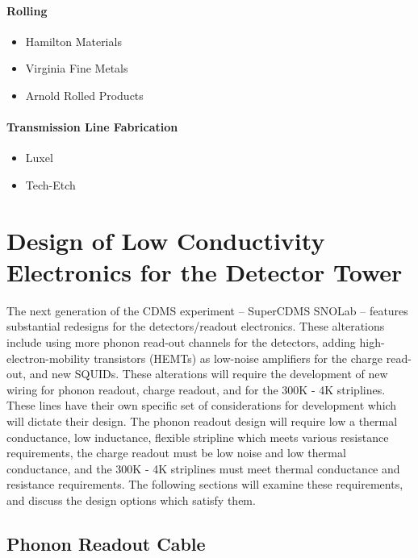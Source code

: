 \documentclass{report}
\begin{document}
\subsubsection{Rolling}
\begin{itemize}
\item Hamilton Materials
\item Virginia Fine Metals
\item Arnold Rolled Products
\end{itemize}

\subsubsection{Transmission Line Fabrication}
\begin{itemize}
\item Luxel
\item Tech-Etch
\end{itemize}

\chapter{Design of Low Conductivity Electronics for the Detector Tower}

The next generation of the CDMS experiment -- SuperCDMS SNOLab -- features substantial redesigns for the detectors/readout electronics. These alterations include using more phonon read-out channels for the detectors, adding high-electron-mobility transistors (HEMTs) as low-noise amplifiers for the charge read-out, and new SQUIDs. These alterations will require the development of new wiring for phonon readout, charge readout, and for the 300K - 4K striplines. These lines have their own specific set of considerations for development which will dictate their design. The phonon readout design will require low a thermal conductance, low inductance, flexible stripline which meets various resistance requirements, the charge readout must be low noise and low thermal conductance, and the 300K - 4K striplines must meet thermal conductance and resistance requirements. The following sections will examine these requirements, and discuss the design options which satisfy them.

\section{Phonon Readout Cable}
\end{document}
